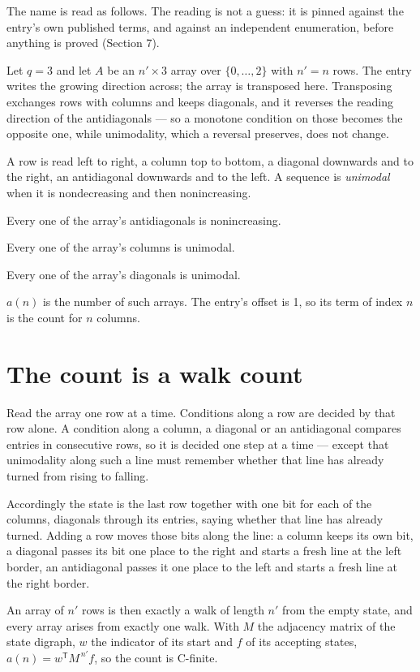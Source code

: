 \documentclass[11pt]{article}
\theoremstyle{definition}
\begin{document}
The name is read as follows. The reading is not a guess: it is pinned against the entry's own published terms, and against an independent enumeration, before anything is proved (Section 7).

Let $q = 3$ and let $A$ be an $n' \times 3$ array over $\{0,\dots,2\}$ with $n' = n$ rows. The entry writes the growing direction across; the array is transposed here. Transposing exchanges rows with columns and keeps diagonals, and it reverses the reading direction of the antidiagonals --- so a monotone condition on those becomes the opposite one, while unimodality, which a reversal preserves, does not change.

A row is read left to right, a column top to bottom, a diagonal downwards and to the right, an antidiagonal downwards and to the left. A sequence is {\itshape unimodal} when it is nondecreasing and then nonincreasing.

Every one of the array's antidiagonals is nonincreasing.

Every one of the array's columns is unimodal.

Every one of the array's diagonals is unimodal.

$a(n)$ is the number of such arrays. The entry's offset is 1, so its term of index $n$ is the count for $n$ columns.

\section{The count is a walk count}

Read the array one row at a time. Conditions along a row are decided by that row alone. A condition along a column, a diagonal or an antidiagonal compares entries in consecutive rows, so it is decided one step at a time --- except that unimodality along such a line must remember whether that line has already turned from rising to falling.

Accordingly the state is the last row together with one bit for each of the columns, diagonals through its entries, saying whether that line has already turned. Adding a row moves those bits along the line: a column keeps its own bit, a diagonal passes its bit one place to the right and starts a fresh line at the left border, an antidiagonal passes it one place to the left and starts a fresh line at the right border.

An array of $n'$ rows is then exactly a walk of length $n'$ from the empty state, and every array arises from exactly one walk. With $M$ the adjacency matrix of the state digraph, $w$ the indicator of its start and $f$ of its accepting states, $a(n) = w^{\mathsf T}M^{\,n'}f$, so the count is C-finite.
\end{document}
